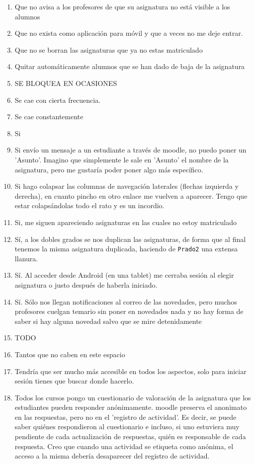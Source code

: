 \begin{enumerate}
\item Que no avisa a los profesores de que su asignatura no está visible a los alumnos
\item Que no exista como aplicación para móvil y que a veces no me deje entrar.
\item Que no se borran las asignaturas que ya no estas matriculado
\item Quitar automáticamente alumnos que se han dado de baja de la asignatura
\item SE BLOQUEA EN OCASIONES
\item Se cae con cierta frecuencia.
\item Se cae constantemente
\item Si
\item Si envío un mensaje a un estudiante a través de moodle, no puedo poner un 'Asunto'. Imagino que simplemente le sale en 'Asunto' el nombre de la asignatura, pero me gustaría poder poner algo más específico.
\item Si hago colapsar las columnas de navegación laterales (flechas izquierda y derecha), en cuanto pincho en otro enlace me vuelven a aparecer. Tengo que estar colapsándolas todo el rato y es un incordio.
\item Si, me siguen apareciendo asignaturas en las cuales no estoy matriculado
\item Sí, a los dobles grados se nos duplican las asignaturas, de forma que al final tenemos la misma asignatura duplicada, haciendo de \texttt{Prado2} una extensa llanura.
\item Sí. Al acceder desde Android (en una tablet) me cerraba sesión al elegir asignatura o justo después de haberla iniciado.
\item Sí. Sólo nos llegan notificaciones al correo de las novedades, pero muchos profesores cuelgan temario sin poner en novedades nada y no hay forma de saber si hay alguna novedad salvo que se mire detenidamente
\item TODO
\item Tantos que no caben en este espacio
\item Tendría que ser mucho más accesible en todos los aspectos, solo para iniciar sesión tienes que buscar donde hacerlo.
\item Todos los cursos pongo un cuestionario de valoración de la asignatura que los estudiantes pueden responder anónimamente. moodle preserva el anonimato en las respuestas, pero no en el 'registro de actividad'. Es decir, se puede saber quiénes respondieron al cuestionario e incluso, si uno estuviera muy pendiente de cada actualización de respuestas, quién es responsable de cada respuesta. Creo que cuando una actividad se etiqueta como anónima, el acceso a la misma debería desaparecer del registro de actividad.

\end{enumerate}
